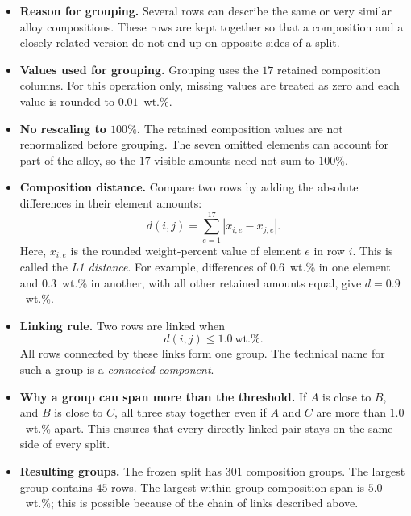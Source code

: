 \documentclass[11pt]{article}
\newenvironment{notes}
  {\begin{itemize}\setlength{\itemsep}{0.45em}\setlength{\parsep}{0pt}}
  {\end{itemize}}
\begin{document}
\begin{notes}
    \item \textbf{Reason for grouping.} Several rows can describe the
    same or very similar alloy compositions. These rows are kept
    together so that a composition and a closely related version do
    not end up on opposite sides of a split.

    \item \textbf{Values used for grouping.} Grouping uses the \(17\)
    retained composition columns. For this operation only, missing
    values are treated as zero and each value is rounded to
    \(0.01\)~wt.\%.

    \item \textbf{No rescaling to \(100\%\).} The retained composition
    values are not renormalized before grouping. The seven omitted
    elements can account for part of the alloy, so the \(17\) visible
    amounts need not sum to \(100\%\).

    \item \textbf{Composition distance.} Compare two rows by adding
    the absolute differences in their element amounts:
    \begin{equation}
        d(i,j)=\sum_{e=1}^{17}|x_{i,e}-x_{j,e}|.
        \label{eq:composition-distance}
    \end{equation}
    Here, \(x_{i,e}\) is the rounded weight-percent value of element
    \(e\) in row \(i\). This is called the \emph{L1 distance}.
    For example, differences of \(0.6\)~wt.\% in one element and
    \(0.3\)~wt.\% in another, with all other retained amounts equal,
    give \(d=0.9\)~wt.\%.

    \item \textbf{Linking rule.} Two rows are linked when
    \[
        d(i,j)\leq1.0\ \text{wt.\%}.
    \]
    All rows connected by these links form one group. The technical
    name for such a group is a \emph{connected component}.

    \item \textbf{Why a group can span more than the threshold.}
    If \(A\) is close to \(B\), and \(B\) is close to \(C\), all three
    stay together even if \(A\) and \(C\) are more than \(1.0\)~wt.\%
    apart. This ensures that every directly linked pair stays on the
    same side of every split.

    \item \textbf{Resulting groups.} The frozen split has \(301\)
    composition groups. The largest group contains \(45\) rows.
    The largest within-group composition span is \(5.0\)~wt.\%;
    this is possible because of the chain of links described above.


\end{notes}
\end{document}
